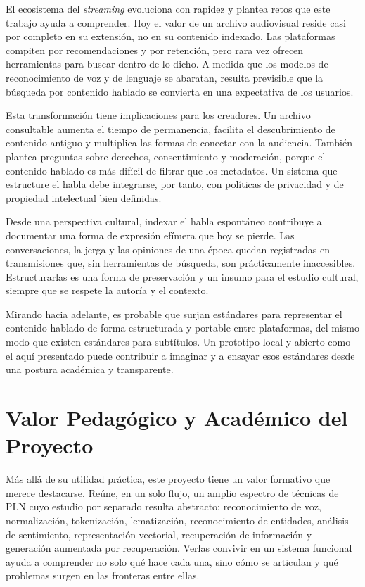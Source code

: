 \documentclass[12pt,a4paper]{article}
\begin{document}
El ecosistema del \emph{streaming} evoluciona con rapidez y plantea retos que este trabajo ayuda a comprender. Hoy el valor de un archivo audiovisual reside casi por completo en su extensión, no en su contenido indexado. Las plataformas compiten por recomendaciones y por retención, pero rara vez ofrecen herramientas para buscar dentro de lo dicho. A medida que los modelos de reconocimiento de voz y de lenguaje se abaratan, resulta previsible que la búsqueda por contenido hablado se convierta en una expectativa de los usuarios.

Esta transformación tiene implicaciones para los creadores. Un archivo consultable aumenta el tiempo de permanencia, facilita el descubrimiento de contenido antiguo y multiplica las formas de conectar con la audiencia. También plantea preguntas sobre derechos, consentimiento y moderación, porque el contenido hablado es más difícil de filtrar que los metadatos. Un sistema que estructure el habla debe integrarse, por tanto, con políticas de privacidad y de propiedad intelectual bien definidas.

Desde una perspectiva cultural, indexar el habla espontáneo contribuye a documentar una forma de expresión efímera que hoy se pierde. Las conversaciones, la jerga y las opiniones de una época quedan registradas en transmisiones que, sin herramientas de búsqueda, son prácticamente inaccesibles. Estructurarlas es una forma de preservación y un insumo para el estudio cultural, siempre que se respete la autoría y el contexto.

Mirando hacia adelante, es probable que surjan estándares para representar el contenido hablado de forma estructurada y portable entre plataformas, del mismo modo que existen estándares para subtítulos. Un prototipo local y abierto como el aquí presentado puede contribuir a imaginar y a ensayar esos estándares desde una postura académica y transparente.



\section{Valor Pedagógico y Académico del Proyecto}
\label{sec:pedagogico}

Más allá de su utilidad práctica, este proyecto tiene un valor formativo que merece destacarse. Reúne, en un solo flujo, un amplio espectro de técnicas de PLN cuyo estudio por separado resulta abstracto: reconocimiento de voz, normalización, tokenización, lematización, reconocimiento de entidades, análisis de sentimiento, representación vectorial, recuperación de información y generación aumentada por recuperación. Verlas convivir en un sistema funcional ayuda a comprender no solo qué hace cada una, sino cómo se articulan y qué problemas surgen en las fronteras entre ellas.
\end{document}
